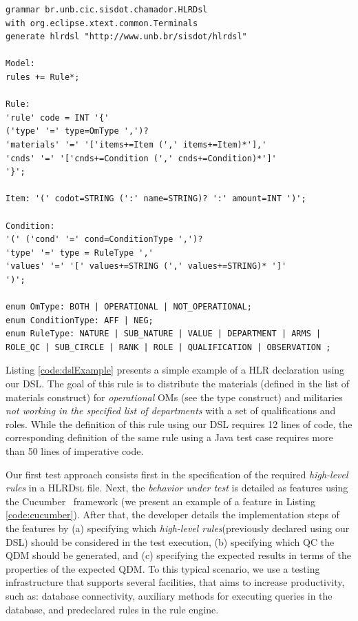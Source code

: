 \documentclass{bmcart}
\newcommand{\callers}{\emph{high-level rules}\xspace}
\newcommand{\shc}{HLR\xspace}
\newcommand{\hlrdsl}{\textsc{HLRDsl}\xspace}
\begin{document}
\begin{lstlisting}[frame=single, language=Xtext, caption={\it Xtext grammar defining the DSL structure}, label={code:gramatica}]
grammar br.unb.cic.sisdot.chamador.HLRDsl 
with org.eclipse.xtext.common.Terminals
generate hlrdsl "http://www.unb.br/sisdot/hlrdsl"

Model:
rules += Rule*;

Rule:
'rule' code = INT '{'
('type' '=' type=OmType ',')?
'materials' '=' '['items+=Item (',' items+=Item)*'],'
'cnds' '=' '['cnds+=Condition (',' cnds+=Condition)*']'
'}';

Item: '(' codot=STRING (':' name=STRING)? ':' amount=INT ')';

Condition:
'(' ('cond' '=' cond=ConditionType ',')?
'type' '=' type = RuleType ','
'values' '=' '[' values+=STRING (',' values+=STRING)* ']'
')';

enum OmType: BOTH | OPERATIONAL | NOT_OPERATIONAL;
enum ConditionType: AFF | NEG;
enum RuleType: NATURE | SUB_NATURE | VALUE | DEPARTMENT | ARMS | ROLE_QC | SUB_CIRCLE | RANK | ROLE | QUALIFICATION | OBSERVATION ;
\end{lstlisting}

Listing \ref{code:dslExample} presents a simple example of a \shc declaration using our DSL. The goal of this rule is to distribute 
the materials (defined in the list of materials construct) for \emph{operational} OMs (see the type construct) and militaries \emph{not working in the specified list of departments} with a set of qualifications and roles. While the definition of this rule 
using our DSL requires 12 lines of code, the corresponding definition of the same rule using a Java test case requires more than 50 lines of imperative code.

Our first test approach consists first in the specification of the required \callers in a \hlrdsl file. Next, the \emph{behavior under test} is detailed as features using the Cucumber~\cite{wynne2017cucumber} framework (we present an example of a feature in Listing \ref{code:cucumber}). After that, the developer details the implementation steps of the features by (a) specifying which \callers(previously declared using our DSL) should be considered in the test execution, (b) specifying which QC the QDM should be generated, and (c) specifying the expected results in terms of the properties of the expected QDM. To this typical scenario, we use a testing  infrastructure that supports several facilities, that aims to increase productivity, such as: database connectivity, auxiliary methods for executing queries in the database, and predeclared rules in the rule engine.
\end{document}
